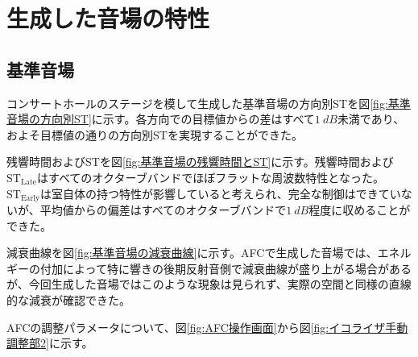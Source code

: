 \documentclass[11pt,a4j]{jreport}
\begin{document}
\section{生成した音場の特性}

\subsection{基準音場}
コンサートホールのステージを模して生成した基準音場の方向別STを図\ref{fig:基準音場の方向別ST}に示す。各方向での目標値からの差はすべて$\SI{1}{dB}$未満であり、およそ目標値の通りの方向別STを実現することができた。

残響時間およびSTを図\ref{fig:基準音場の残響時間とST}に示す。残響時間および$\mathrm{ST_{Late}}$はすべてのオクターブバンドでほぼフラットな周波数特性となった。$\mathrm{ST_{Early}}$は室自体の持つ特性が影響していると考えられ、完全な制御はできていないが、平均値からの偏差はすべてのオクターブバンドで$\SI{1}{dB}$程度に収めることができた。

減衰曲線を図\ref{fig:基準音場の減衰曲線}に示す。AFCで生成した音場では、エネルギーの付加によって特に響きの後期反射音側で減衰曲線が盛り上がる場合があるが、今回生成した音場ではこのような現象は見られず、実際の空間と同様の直線的な減衰が確認できた。

AFCの調整パラメータについて、図\ref{fig:AFC操作画面}から図\ref{fig:イコライザ手動調整部2}に示す。
\end{document}
